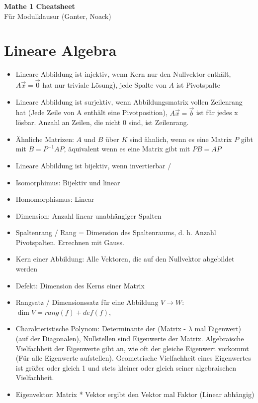 \documentclass[12pt,landscape]{article}
\begin{document}
\footnotesize
\begin{multicols}{3}

\begin{center}
     \Large{\textbf{Mathe 1 Cheatsheet}} \\
     \small{Für Modulklausur (Ganter, Noack)}
\end{center}

\section{Lineare Algebra}
\begin{itemize}
\item Lineare Abbildung ist injektiv, wenn Kern nur den Nullvektor enthält, $A\vec{x} = \vec{0}$ hat nur triviale Lösung), jede Spalte von $A$ ist Pivotspalte
\item Lineare Abbildung ist surjektiv, wenn Abbildungsmatrix vollen Zeilenrang hat (Jede Zeile von A enthält eine Pivotposition), $A\vec{x} = \vec{b}$ ist für jedes x lösbar. Anzahl an Zeilen, die nicht 0 sind, ist Zeilenrang.
\item Ähnliche Matrizen: $A$ und $B$ über $K$ sind ähnlich, wenn es eine Matrix $P$ gibt mit $B = P^{-1}AP$, äquivalent wenn es eine Matrix gibt mit $PB = AP$
\item Lineare Abbildung ist bijektiv, wenn invertierbar /
\item Isomorphimus: Bijektiv und linear
\item Homomorphismus: Linear
\item Dimension: Anzahl linear unabhängiger Spalten
\item Spaltenrang / Rang = Dimension des Spaltenraums, d. h. Anzahl Pivotspalten. Errechnen mit Gauss.
\item Kern einer Abbildung: Alle Vektoren, die auf den Nullvektor abgebildet werden
\item Defekt: Dimension des Kerns einer Matrix
\item Rangsatz / Dimensionssatz für eine Abbildung $V \rightarrow W$: $\dim V = rang(f) + def(f)$, 
\item Charakteristische Polynom: Determinante der (Matrix - $\lambda$ mal Eigenwert) (auf der Diagonalen), Nullstellen sind Eigenwerte der Matrix. Algebraische Vielfachheit der Eigenwerte gibt an, wie oft der gleiche Eigenwert vorkommt (Für alle Eigenwerte aufstellen). Geometrische Vielfachheit eines Eigenwertes ist größer oder gleich 1 und stets kleiner oder gleich seiner algebraischen Vielfachheit.
\item Eigenvektor: Matrix * Vektor ergibt den Vektor mal Faktor (Linear abhängig)

\end{itemize}
\end{multicols}
\end{document}

